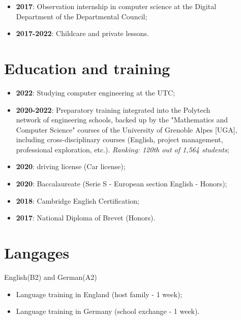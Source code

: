 \documentclass[10pt, oneside, a4paper, titlepage]{article}
\begin{document}
\begin{tcolorbox}
\begin{minipage}[t]{12cm}
\begin{tcolorbox}[grow to right by = 0.6cm, colback = gray!25, colframe = white]
\begin{itemize}
                    \item \textbf{2017}: Observation internship in computer science at the Digital \\Department of the Departmental Council;
                    
                    \item \textbf{2017-2022}: Childcare and private lessons.
                \end{itemize}

                \section*{Education and training}
                \begin{itemize}
                    \item \textbf{2022}: Studying computer engineering at the UTC;
                    \item \textbf{2020-2022}: Preparatory training integrated into the Polytech 
                    \\ network of engineering schools, backed up by the "Mathematics 
                    and Computer Science" courses of the University of Grenoble Alpes [UGA], 
                    including cross-disciplinary courses 
                    (English, project management, professional exploration, etc.). \emph{Ranking: 120th out of 1,564 students};
                    \item \textbf{2020}: driving license (Car license);
                    \item \textbf{2020}: Baccalaureate (Serie S - European section English - Honors); 
                    \item \textbf{2018}: Cambridge English Certification;
                    \item \textbf{2017}: National Diploma of Brevet (Honors).
                \end{itemize}

                \section*{Langages}
                    English(B2) and German(A2) 
                    \begin{itemize}
                        \item Language training in England (host family - 1 week);
                        \item Language training in Germany (school exchange - 1 week).
                    \end{itemize}

                
            \end{tcolorbox}
        \end{minipage}
    \end{tcolorbox}
\end{document}
